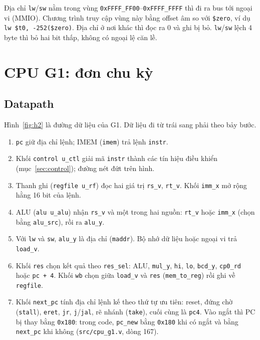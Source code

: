 Địa chỉ \texttt{lw}/\texttt{sw} nằm trong vùng \texttt{0xFFFF\_FF00}--\texttt{0xFFFF\_FFFF} thì đi ra bus tới ngoại vi (MMIO). Chương trình truy cập vùng này bằng offset âm so với \texttt{\$zero}, ví dụ \texttt{lw \$t0, -252(\$zero)}. Địa chỉ ở nơi khác thì đọc ra 0 và ghi bị bỏ. \texttt{lw}/\texttt{sw} lệch 4 byte thì bỏ hai bit thấp, không có ngoại lệ căn lề.

\section{CPU G1: đơn chu kỳ}\label{sec:g1}
\subsection{Datapath}
Hình~\ref{fig:h2} là đường dữ liệu của G1. Dữ liệu đi từ trái sang phải theo bảy bước.
\begin{enumerate}
  \item \texttt{pc} giữ địa chỉ lệnh; IMEM (\texttt{imem}) trả lệnh \texttt{instr}.
  \item Khối \texttt{control u\_ctl} giải mã \texttt{instr} thành các tín hiệu điều khiển (mục~\ref{sec:control}); đường nét đứt trên hình.
  \item Thanh ghi (\texttt{regfile u\_rf}) đọc hai giá trị \texttt{rs\_v}, \texttt{rt\_v}. Khối \texttt{imm\_x} mở rộng hằng 16 bit của lệnh.
  \item ALU (\texttt{alu u\_alu}) nhận \texttt{rs\_v} và một trong hai nguồn: \texttt{rt\_v} hoặc \texttt{imm\_x} (chọn bằng \texttt{alu\_src}), rồi ra \texttt{alu\_y}.
  \item Với \texttt{lw} và \texttt{sw}, \texttt{alu\_y} là địa chỉ (\texttt{maddr}). Bộ nhớ dữ liệu hoặc ngoại vi trả \texttt{load\_v}.
  \item Khối \texttt{res} chọn kết quả theo \texttt{res\_sel}: ALU, \texttt{mul\_y}, \texttt{hi}, \texttt{lo}, \texttt{bcd\_y}, \texttt{cp0\_rd} hoặc \texttt{pc + 4}. Khối \texttt{wb} chọn giữa \texttt{load\_v} và \texttt{res} (\texttt{mem\_to\_reg}) rồi ghi về \texttt{regfile}.
  \item Khối \texttt{next\_pc} tính địa chỉ lệnh kế theo thứ tự ưu tiên: reset, đứng chờ (\texttt{stall}), \texttt{eret}, \texttt{jr}, \texttt{j}/\texttt{jal}, rẽ nhánh (\texttt{take}), cuối cùng là \texttt{pc4}. Vào ngắt thì PC bị thay bằng \texttt{0x180}: trong code, \texttt{pc\_new} bằng \texttt{0x180} khi có ngắt và bằng \texttt{next\_pc} khi không (\texttt{src/cpu\_g1.v}, dòng 167).
\end{enumerate}

